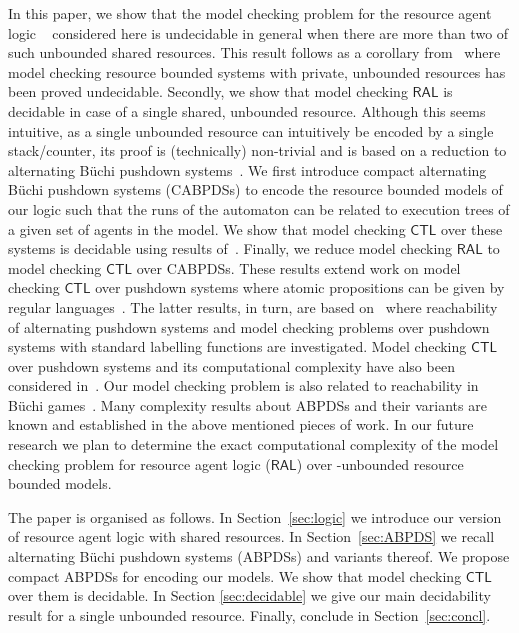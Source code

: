 \documentclass{llncs}
\newcommand{\ral}{\ensuremath{\mathsf{RAL}}\xspace}
\renewcommand{\CTL}{\ensuremath{\mathsf{CTL}}\xspace}
\begin{document}
In this paper, we show that the model checking problem for the resource agent logic ~\cite{Bulling/Farwer:10a} considered here is undecidable in general  when there are more than two of such unbounded shared resources. This result follows as a corollary from~\cite{Bulling/Farwer:10a,Bulling15ral-IJCAI} where model checking resource bounded systems with private, unbounded resources has been proved undecidable. 
Secondly, we show that model checking  \ral is decidable in case of  a single shared, unbounded resource. Although this seems intuitive, as a single unbounded resource can intuitively  be encoded by a single stack/counter, its proof is (technically)  non-trivial and is based on a reduction to  alternating B\"uchi pushdown systems~\cite{song2014efficient,bouajjani1997reachability}. We first introduce  compact alternating B\"uchi pushdown systems (CABPDSs)  to encode the resource bounded models of our logic such  that the runs of the automaton can be related to execution trees of a given set of agents in the model. We show that model checking \CTL over these systems is decidable using results of~\cite{song2014efficient}. Finally, we reduce model checking \ral to model checking \CTL over CABPDSs. These results extend work on model checking \CTL over pushdown systems where atomic propositions can be given by regular languages~\cite{song2014efficient}. The latter results, in turn, are based on~\cite{bouajjani1997reachability} where reachability of alternating pushdown systems and model checking problems over pushdown systems with standard labelling functions are investigated. Model checking \CTL  over pushdown systems and its computational complexity have also been considered in~\cite{bozzelli2007complexity}. Our model checking problem is also related to reachability in B\"uchi games~\cite{cachat2002symbolic}. Many complexity results about ABPDSs and their variants are known and established in the above mentioned pieces of work. In our future research we  plan to determine the exact computational complexity of the model checking problem for resource agent logic (\ral) over  -unbounded resource bounded models.

The paper is organised as follows. In Section~\ref{sec:logic} we  introduce our version of resource agent logic with shared resources.  In Section~\ref{sec:ABPDS} we recall  alternating B\"uchi pushdown systems (ABPDSs) and variants thereof. We propose compact ABPDSs for encoding our models. We show that model checking \CTL over them is decidable. In Section \ref{sec:decidable} we give our main decidability result for a single unbounded resource. Finally, conclude in Section~\ref{sec:concl}. 
\vspace{-0.4cm}
\end{document}
